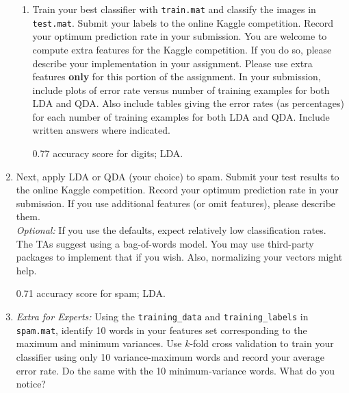 \begin{enumerate}[label=(\alph*)]
\begin{enumerate}[label=(\roman*)]
      \item Train your best classifier with \texttt{train.mat} and classify the
        images in \texttt{test.mat}. Submit your labels to the online Kaggle
        competition. Record your optimum prediction rate in your
        submission. You are welcome to compute extra features for the Kaggle
        competition. If you do so, please describe your implementation in your
        assignment. Please use extra features \textbf{only} for this portion of
        the assignment. In your submission, include plots of error rate versus
        number of training examples for both LDA and QDA. Also include tables
        giving the error rates (as percentages) for each number of training
        examples for both LDA and QDA. Include written answers where indicated.
        \begin{mdframed}
          0.77 accuracy score for digits; LDA.
        \end{mdframed}

    \end{enumerate}
  \item Next, apply LDA or QDA (your choice) to spam. Submit your test results to the online Kaggle competition. Record your optimum prediction rate in your submission. If you use additional features (or omit features), please describe them. \\

      \emph{Optional:} If you use the defaults, expect relatively low
      classification rates. The TAs suggest using a bag-of-words model. You may
      use third-party packages to implement that if you wish. Also, normalizing
      your vectors might help.

    \begin{mdframed}
      0.71 accuracy score for spam; LDA.
    \end{mdframed}

    \item \emph{Extra for Experts:} Using the \texttt{training\_data} and \texttt{training\_labels} in \texttt{spam.mat}, identify 10 words in your features set corresponding to the maximum and minimum variances. Use $k$-fold cross validation to train your classifier using only 10 variance-maximum words and record your average error rate. Do the same with the 10 minimum-variance words. What do you notice?
    \begin{mdframed} \solution
    \end{mdframed}
\end{enumerate}


